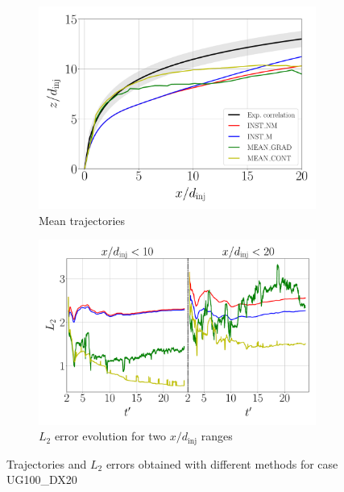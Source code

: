 \begin{figure}[ht]
\flushleft
\hspace{-0.5in}
\begin{subfigure}[b]{0.45\textwidth}
	\flushleft
   \includegraphics[scale=0.25]{./part2_developments/figures_ch5_resolved_JICF/results_trajectories/methods_comparison_trajectories_q6uG100_dx20.pdf}
   \vspace*{-0.25in}
   \caption{Mean trajectories}
\end{subfigure}
\hspace{0.25in}
\begin{subfigure}[b]{0.45\textwidth}
	\flushleft
   \includegraphics[scale=0.25]{./part2_developments/figures_ch5_resolved_JICF/results_trajectories/methods_comparison_L2_evolution_q6uG100_dx20_shared_y_axis.pdf}
   \vspace*{-0.25in}
   \caption{$L_2$ error evolution for two $x/d_\mathrm{inj}$ ranges}
\end{subfigure}
\caption{Trajectories and $L_2$ errors obtained with different methods for case UG100\_DX20}
\label{fig:JICF_trajectories_and_L2_comparison}
\end{figure}

